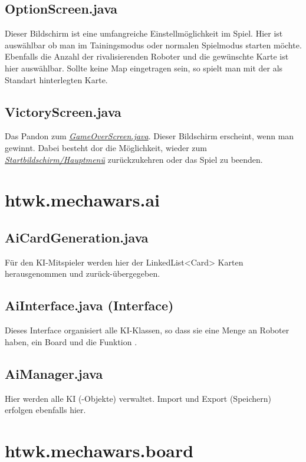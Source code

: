 \documentclass[12pt,a4paper,oneside]{book}
\theoremstyle{plain}
\numberwithin{equation}{chapter} \DeclareMathOperator{\Var}{Var}
\begin{document}
\subsection{OptionScreen.java}
    Dieser Bildschirm ist eine umfangreiche Einstellmöglichkeit im Spiel. Hier ist auswählbar ob man im Tainingsmodus oder normalen Spielmodus starten möchte. Ebenfalls die Anzahl der rivalisierenden Roboter und die gewünschte Karte ist hier auswählbar. Sollte keine Map eingetragen sein, so spielt man mit der als Standart hinterlegten Karte.
  
\subsection{VictoryScreen.java}
    Das Pandon zum \hyperlink{GameOverScreen.java}{\textit{GameOverScreen.java}}.
    Dieser Bildschirm erscheint, wenn man gewinnt. Dabei besteht dor die Möglichkeit, wieder zum \hyperlink{MainMenue.java}{\textit{Startbildschirm/Hauptmenü}} zurückzukehren oder das Spiel zu beenden.
    

\newpage
\section{htwk.mechawars.ai}
\subsection{AiCardGeneration.java}
    Für den KI-Mitspieler werden hier der LinkedList<Card> Karten herausgenommen und zurück-übergegeben.
    
\subsection{AiInterface.java (Interface)}
    Dieses Interface organisiert alle KI-Klassen, so dass sie eine Menge an Roboter haben, ein Board und die Funktion .
    
\subsection{AiManager.java}
    Hier werden alle KI (-Objekte) verwaltet. Import und Export (Speichern) erfolgen ebenfalls hier.


\newpage
\section{htwk.mechawars.board}
\end{document}
